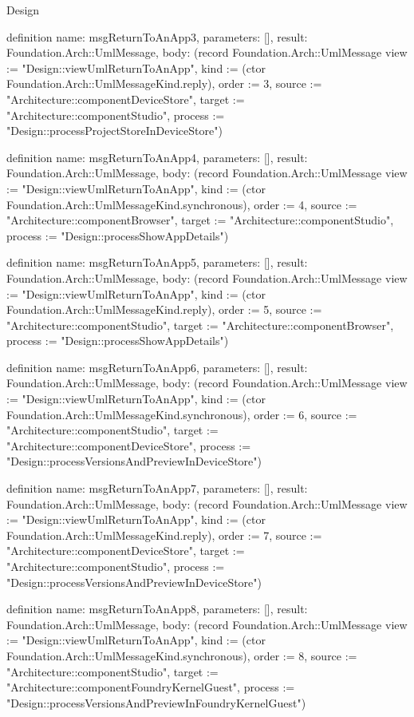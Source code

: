 \begin{lexlean}{Design}
\begin{semanticmodule}
definition{
  name: msgReturnToAnApp3,
  parameters: [],
  result: Foundation.Arch::UmlMessage,
  body: (record Foundation.Arch::UmlMessage {view := "Design::viewUmlReturnToAnApp", kind := (ctor Foundation.Arch::UmlMessageKind.reply), order := 3, source := "Architecture::componentDeviceStore", target := "Architecture::componentStudio", process := "Design::processProjectStoreInDeviceStore"})
}

definition{
  name: msgReturnToAnApp4,
  parameters: [],
  result: Foundation.Arch::UmlMessage,
  body: (record Foundation.Arch::UmlMessage {view := "Design::viewUmlReturnToAnApp", kind := (ctor Foundation.Arch::UmlMessageKind.synchronous), order := 4, source := "Architecture::componentBrowser", target := "Architecture::componentStudio", process := "Design::processShowAppDetails"})
}

definition{
  name: msgReturnToAnApp5,
  parameters: [],
  result: Foundation.Arch::UmlMessage,
  body: (record Foundation.Arch::UmlMessage {view := "Design::viewUmlReturnToAnApp", kind := (ctor Foundation.Arch::UmlMessageKind.reply), order := 5, source := "Architecture::componentStudio", target := "Architecture::componentBrowser", process := "Design::processShowAppDetails"})
}

definition{
  name: msgReturnToAnApp6,
  parameters: [],
  result: Foundation.Arch::UmlMessage,
  body: (record Foundation.Arch::UmlMessage {view := "Design::viewUmlReturnToAnApp", kind := (ctor Foundation.Arch::UmlMessageKind.synchronous), order := 6, source := "Architecture::componentStudio", target := "Architecture::componentDeviceStore", process := "Design::processVersionsAndPreviewInDeviceStore"})
}

definition{
  name: msgReturnToAnApp7,
  parameters: [],
  result: Foundation.Arch::UmlMessage,
  body: (record Foundation.Arch::UmlMessage {view := "Design::viewUmlReturnToAnApp", kind := (ctor Foundation.Arch::UmlMessageKind.reply), order := 7, source := "Architecture::componentDeviceStore", target := "Architecture::componentStudio", process := "Design::processVersionsAndPreviewInDeviceStore"})
}

definition{
  name: msgReturnToAnApp8,
  parameters: [],
  result: Foundation.Arch::UmlMessage,
  body: (record Foundation.Arch::UmlMessage {view := "Design::viewUmlReturnToAnApp", kind := (ctor Foundation.Arch::UmlMessageKind.synchronous), order := 8, source := "Architecture::componentStudio", target := "Architecture::componentFoundryKernelGuest", process := "Design::processVersionsAndPreviewInFoundryKernelGuest"})
}


\end{semanticmodule}
\end{lexlean}
